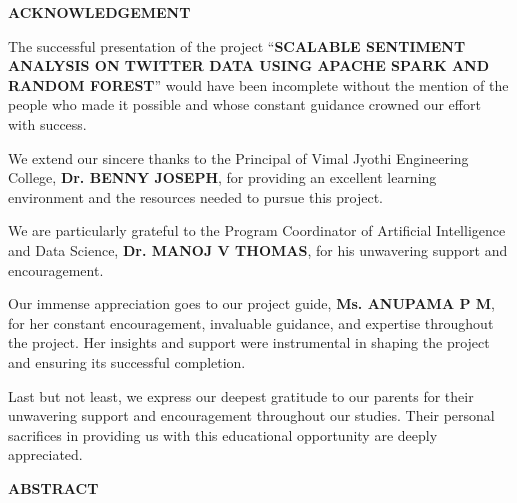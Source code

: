 \documentclass[12pt,a4paper]{article}
\begin{document}
\newpage
\thispagestyle{empty}

\begin{center}
    {\bfseries \Large ACKNOWLEDGEMENT \par}
    \vspace{1.5cm}
\end{center}

\begin{justify}
\sloppy
{}
\setlength{\parindent}{0pt}

The successful presentation of the project ``\textbf{SCALABLE SENTIMENT ANALYSIS ON TWITTER DATA USING APACHE SPARK AND RANDOM FOREST}'' would have been incomplete without the mention of the people who made it possible and whose constant guidance crowned our effort with success.

We extend our sincere thanks to the Principal of Vimal Jyothi Engineering College, \textbf{Dr. BENNY JOSEPH}, for providing an excellent learning environment and the resources needed to pursue this project.

We are particularly grateful to the Program Coordinator of Artificial Intelligence and Data Science, \textbf{Dr. MANOJ V THOMAS}, for his unwavering support and encouragement.

Our immense appreciation goes to our project guide, \textbf{Ms. ANUPAMA P M}, for her constant encouragement, invaluable guidance, and expertise throughout the project. Her insights and support were instrumental in shaping the project and ensuring its successful completion.

Last but not least, we express our deepest gratitude to our parents for their unwavering support and encouragement throughout our studies. Their personal sacrifices in providing us with this educational opportunity are deeply appreciated.

\end{justify}

\newpage
\thispagestyle{empty}

\begin{center}

{\bfseries
\fontsize{16}{19}\selectfont
ABSTRACT
\par}

\end{center}

\vspace{0.3in}
\end{document}
